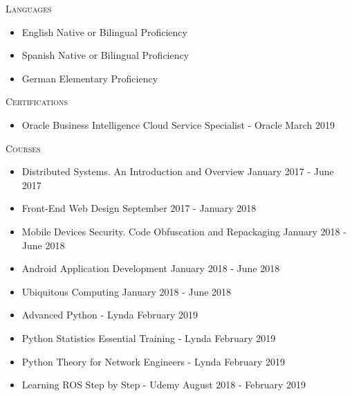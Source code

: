 \documentclass[11pt]{article}
\let\oldbibentry\bibentry
\renewcommand{\bibentry}[1]{\oldbibentry{#1}.}
\renewcommand{\section}[1]
{\vspace{1.0\baselineskip}{\Large\textbf{#1}}}
\begin{document}




\section{Skills}

\textsc{Languages}
\begin{itemize}
    \item[] English \hfill Native or Bilingual Proficiency
    \item[] Spanish \hfill Native or Bilingual Proficiency
    \item[] German \hfill Elementary Proficiency
\end{itemize}

\textsc{Certifications}
\begin{itemize}
    \item[] Oracle Business Intelligence Cloud Service Specialist - Oracle \hfill March 2019
\end{itemize}

\textsc{Courses}
\begin{itemize}
    \item[] Distributed Systems. An Introduction and Overview \hfill January 2017 - June 2017
    \item[] Front-End Web Design \hfill September 2017 - January 2018
    \item[] Mobile Devices Security. Code Obfuscation and Repackaging \hfill January 2018 - June 2018
    \item[] Android Application Development \hfill January 2018 - June 2018
    \item[] Ubiquitous Computing \hfill January 2018 - June 2018
    \item[] Advanced Python - Lynda \hfill February 2019
    \item[] Python Statistics Essential Training - Lynda \hfill February 2019
    \item[] Python Theory for Network Engineers - Lynda \hfill February 2019
    \item[] Learning ROS Step by Step - Udemy \hfill August 2018 - February 2019
\end{itemize}
\end{document}
